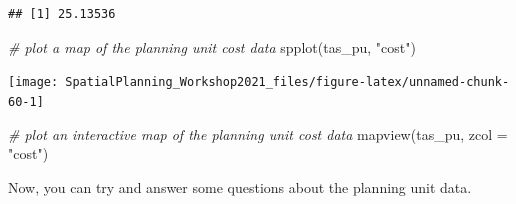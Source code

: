 \documentclass[
  12pt,
]{book}
\newenvironment{Shaded}{\begin{snugshade}}{\end{snugshade}}
\newcommand{\AttributeTok}[1]{\textcolor[rgb]{0.77,0.63,0.00}{#1}}
\newcommand{\CommentTok}[1]{\textcolor[rgb]{0.56,0.35,0.01}{\textit{#1}}}
\newcommand{\FunctionTok}[1]{\textcolor[rgb]{0.00,0.00,0.00}{#1}}
\newcommand{\NormalTok}[1]{#1}
\newcommand{\SpecialCharTok}[1]{\textcolor[rgb]{0.00,0.00,0.00}{#1}}
\newcommand{\StringTok}[1]{\textcolor[rgb]{0.31,0.60,0.02}{#1}}
\begin{document}
\begin{Shaded}
\end{Shaded}

\begin{verbatim}
## [1] 25.13536
\end{verbatim}

\begin{Shaded}
\begin{Highlighting}[]
\CommentTok{\# plot a map of the planning unit cost data}
\FunctionTok{spplot}\NormalTok{(tas\_pu, }\StringTok{"cost"}\NormalTok{)}
\end{Highlighting}
\end{Shaded}

\begin{center}\texttt{[image: SpatialPlanning\_Workshop2021\_files/figure-latex/unnamed-chunk-60-1]} \end{center}

\begin{Shaded}
\begin{Highlighting}[]
\CommentTok{\# plot an interactive map of the planning unit cost data}
\FunctionTok{mapview}\NormalTok{(tas\_pu, }\AttributeTok{zcol =} \StringTok{"cost"}\NormalTok{)}
\end{Highlighting}
\end{Shaded}

Now, you can try and answer some questions about the planning unit data.
\end{document}
